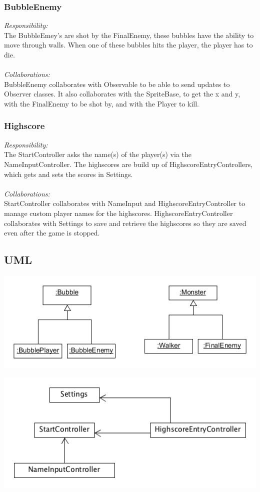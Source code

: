 \subsubsection{BubbleEnemy}
\textit{Responsibility:} \\
The BubbleEmey's are shot by the FinalEnemy, these bubbles have the ability to move through walls. When one of these bubbles hits the player, the player has to die. \\ \\
\textit{Collaborations:} \\
BubbleEnemy collaborates with Observable to be able to send updates to Observer classes. It also collaborates with  the SpriteBase, to get the x and y, with the FinalEnemy to be shot by, and with the Player to kill.

\subsubsection{Highscore}
\textit{Responsibility:} \\
The StartController asks the name(s) of the player(s) via the NameInputController. The highscores are build up of HighscoreEntryControllers, which gets and sets the scores in Settings. \\ \\
\textit{Collaborations:} \\
StartController collaborates with NameInput and HighscoreEntryController to manage custom player names for the highscores. HighscoreEntryController collaborates with Settings to save and retrieve the highscores so they are saved even after the game is stopped.

\subsection{UML}
\includegraphics[width=150mm]{FinalEnemyUml.png}

\includegraphics[width=150mm]{HighscoreUML.png}
